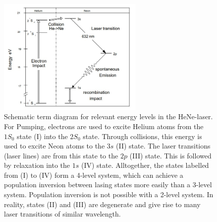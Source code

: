 \documentclass[../main.tex]{subfiles}
\begin{document}
    \begin{figure}[H]
        \centering
        \includegraphics[width=7cm]{Bilddateien/Einleitung/Einleitung-Termschema.jpg}
        \caption{Schematic term diagram for relevant energy levels in the HeNe-laser. For Pumping, electrons are used to excite Helium atoms from the $1S_0$ state (I) into the $2S_0$ state. Through collisions, this energy is used to excite Neon atoms to the $3s$ (II) state. The laser transitions (laser lines) are from this state to the $2p$ (III) state. This is followed by relaxation into the $1s$ (IV) state. Alltogether, the states labelled from (I) to (IV) form a 4-level system, which can achieve a population inversion between lasing states more easily than a 3-level system. Population inversion is not possible with a 2-level system. In reality, states (II) and (III) are degenerate and give rise to many laser transitions of similar wavelength.}
        \label{fig:Einleitung-Termschema}
    \end{figure}
\end{document}
